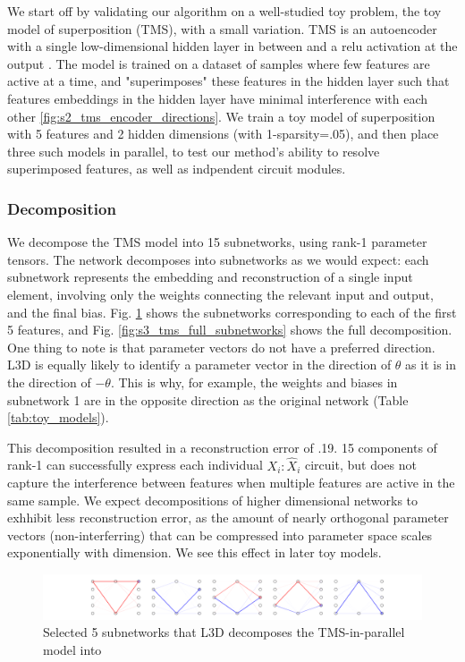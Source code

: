 \documentclass{article}
\theoremstyle{plain}
\theoremstyle{definition}
\theoremstyle{remark}
\begin{document}
We start off by validating our algorithm on a well-studied toy problem, the toy model of superposition (TMS), with a small variation. TMS is an autoencoder with a single low-dimensional hidden layer in between and a relu activation at the output \cite{elhage2022toy}. The model is trained on a dataset of samples where few features are active at a time, and "superimposes" these features in the hidden layer such that features embeddings in the hidden layer have minimal interference with each other \ref{fig:s2_tms_encoder_directions}. We train a toy model of superposition with 5 features and 2 hidden dimensions (with 1-sparsity=.05), and then place three such models in parallel, to test our method's ability to resolve superimposed features, as well as indpendent circuit modules.


\subsubsection{Decomposition}
We decompose the TMS model into 15 subnetworks, using rank-1 parameter tensors. The network decomposes into subnetworks as we would expect: each subnetwork represents the embedding and reconstruction of a single input element, involving only the weights connecting the relevant input and output, and the final bias. Fig. \ref{fig:3_tms_subnetworks_first5} shows the subnetworks corresponding to each of the first 5 features, and Fig. \ref{fig:s3_tms_full_subnetworks} shows the full decomposition. One thing to note is that parameter vectors do not have a preferred direction. L3D is equally likely to identify a parameter vector in the direction of $\theta$ as it is in the direction of $-\theta$. This is why, for example, the weights and biases in subnetwork 1 are in the opposite direction as the original network (Table \ref{tab:toy_models}).

This decomposition resulted in a reconstruction error of .19. 15 components of rank-1 can successfully express each individual $X_i:\hat{X}_i$ circuit, but does not capture the interference between features when multiple features are active in the same sample. We expect decompositions of higher dimensional networks to exhhibit less reconstruction error, as the amount of nearly orthogonal parameter vectors (non-interferring) that can be compressed into parameter space scales exponentially with dimension. We see this effect in later toy models. 

\begin{figure}
    \centerline{\includegraphics[width=\textwidth]{../figures/3_tms_first_5_subnetworks.pdf}}
    \centering
    \caption{Selected 5 subnetworks that L3D decomposes the TMS-in-parallel model into}\label{fig:3_tms_subnetworks_first5}
\end{figure}
\end{document}
